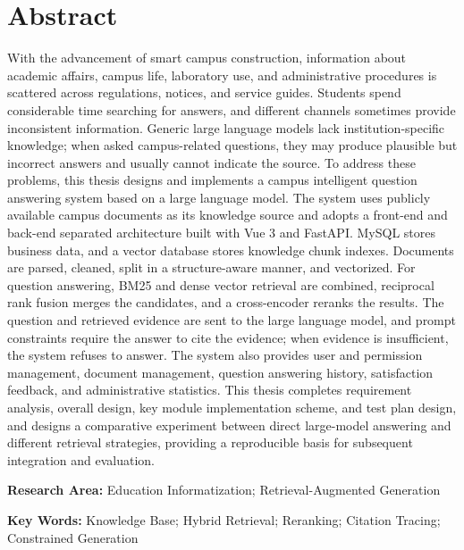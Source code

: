 \documentclass[UTF8,a4paper,zihao=-4,fontset=windows,oneside]{ctexbook}
\numberwithin{figure}{chapter}
\numberwithin{table}{chapter}
\numberwithin{equation}{chapter}
\begin{document}
\chapter*{Abstract}
{}
\begingroup
\rmfamily
\setlength{\parindent}{0pt}
\setlength{\parskip}{6pt}
With the advancement of smart campus construction, information about academic affairs, campus life, laboratory use, and administrative procedures is scattered across regulations, notices, and service guides. Students spend considerable time searching for answers, and different channels sometimes provide inconsistent information. Generic large language models lack institution-specific knowledge; when asked campus-related questions, they may produce plausible but incorrect answers and usually cannot indicate the source. To address these problems, this thesis designs and implements a campus intelligent question answering system based on a large language model. The system uses publicly available campus documents as its knowledge source and adopts a front-end and back-end separated architecture built with Vue 3 and FastAPI. MySQL stores business data, and a vector database stores knowledge chunk indexes. Documents are parsed, cleaned, split in a structure-aware manner, and vectorized. For question answering, BM25 and dense vector retrieval are combined, reciprocal rank fusion merges the candidates, and a cross-encoder reranks the results. The question and retrieved evidence are sent to the large language model, and prompt constraints require the answer to cite the evidence; when evidence is insufficient, the system refuses to answer. The system also provides user and permission management, document management, question answering history, satisfaction feedback, and administrative statistics. This thesis completes requirement analysis, overall design, key module implementation scheme, and test plan design, and designs a comparative experiment between direct large-model answering and different retrieval strategies, providing a reproducible basis for subsequent integration and evaluation.
\endgroup

\vspace{0.8cm}
{\rmfamily
\noindent\textbf{Research Area:} Education Informatization; Retrieval-Augmented Generation\par
\noindent\textbf{Key Words:} Knowledge Base; Hybrid Retrieval; Reranking; Citation Tracing; Constrained Generation\par
}

\clearpage
{}
\begingroup
\linespread{1.05}\selectfont
\tableofcontents
\endgroup

\clearpage
{}









\end{document}
